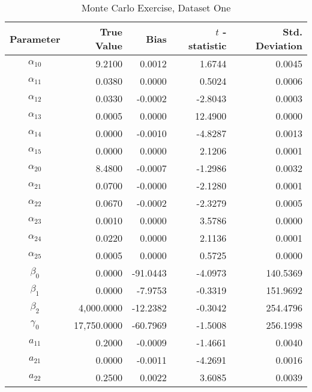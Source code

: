\begin{table}\onehalfspacing
\begin{center}
\begin{threeparttable}
  \caption{Monte Carlo Exercise, Dataset One}
  \label{Monte Carlo: One}
  \begin{tabular}{crrrr}\toprule

  Parameter & True Value & Bias & $t$ - statistic & Std. Deviation \\
  \midrule
  $\alpha_{10}$ &     \phantom{20000}9.2100 &    \phantom{-17}0.0012 &     1.6744 &      0.0045 \\
  $\alpha_{11}$ &     0.0380 &      0.0000 &      0.5024 &       0.0006 \\
  $\alpha_{12}$ &     0.0330 &     -0.0002 &     -2.8043 &       0.0003 \\
  $\alpha_{13}$ &     0.0005 &      0.0000 &     12.4900 &       0.0000 \\
  $\alpha_{14}$ &     0.0000 &     -0.0010 &     -4.8287 &       0.0013 \\
  $\alpha_{15}$ &     0.0000 &      0.0000 &      2.1206 &       0.0001 \\
  $\alpha_{20}$ &     8.4800 &     -0.0007 &     -1.2986 &       0.0032 \\
  $\alpha_{21}$ &     0.0700 &     -0.0000 &     -2.1280 &       0.0001 \\
  $\alpha_{22}$ &     0.0670 &     -0.0002 &     -2.3279 &       0.0005 \\
  $\alpha_{23}$ &     0.0010 &      0.0000 &      3.5786 &       0.0000 \\
  $\alpha_{24}$ &     0.0220 &      0.0000 &      2.1136 &       0.0001 \\
  $\alpha_{25}$ &     0.0005 &      0.0000 &      0.5725 &       0.0000 \\
  $\beta_{0}$   &     0.0000 &    -91.0443 &     -4.0973 &     140.5369 \\
  $\beta_{1}$   &     0.0000 &     -7.9753 &     -0.3319 &     151.9692 \\
  $\beta_{2}$   &  4,000.0000 &   -12.2382 &     -0.3042 &     254.4796 \\
  $\gamma_{0}$  & 17,750.0000 &   -60.7969 &     -1.5008 &     256.1998 \\
  $a_{11}$      &     0.2000 &     -0.0009 &     -1.4661 &       0.0040 \\
  $a_{21}$      &     0.0000 &     -0.0011 &     -4.2691 &       0.0016 \\
  $a_{22}$      &     0.2500 &      0.0022 &      3.6085 &       0.0039 \\

\end{tabular}
\end{threeparttable}
\end{center}
\end{table}
